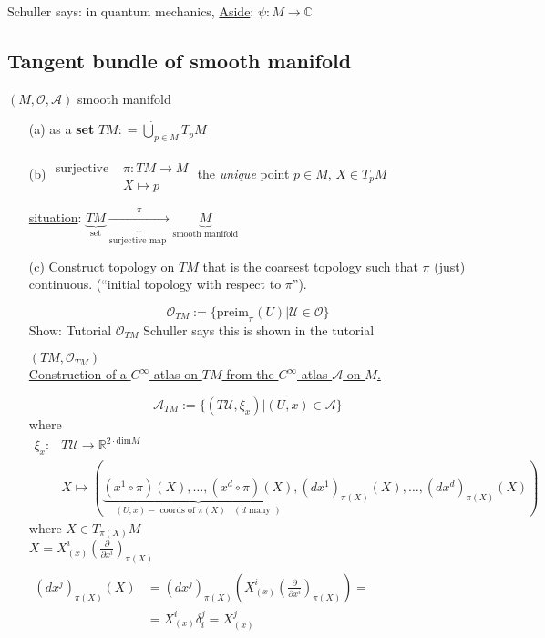 Schuller says: in quantum mechanics, 
\underline{Aside}: $\psi : M \to \mathbb{C}$


\subsection{Tangent bundle of smooth manifold}

$(M,\mathcal{O},\mathcal{A})$ smooth manifold

\begin{enumerate}
\item[(a)] as a \textbf{set}
  $TM : = \dot{\bigcup}_{p\in M} T_pM$
\item[(b)] $\begin{aligned} & \quad \\
  \text{surjective } & \pi: TM \to M \\
  & X\mapsto p \end{aligned}$ the \emph{unique} point $p\in M$, $X \in T_pM$  

\underline{situation}:  $\underbrace{TM}_{\text{set}} \underbrace{ \xrightarrow{ \pi } }_{\text{surjective map }} \underbrace{M}_{\text{smooth manifold}}$

\item[(c)] Construct topology on $TM$ that is the coarsest topology such that $\pi$ (just) continuous.  (``initial topology with respect to $\pi$'').

\[
\mathcal{O}_{TM} := \lbrace \text{preim}_{\pi}(U) | \mathcal{U}\in \mathcal{O} \rbrace
\]
Show: Tutorial $\mathcal{O}_{TM}$
Schuller says this is shown in the tutorial

$(TM,\mathcal{O}_{TM})$  \\

\underline{Construction of a $C^{\infty}$-atlas on $TM$ from the $C^{\infty}$-atlas $\mathcal{A}$ on $M$. }

\[
\mathcal{A}_{TM} := \lbrace (T\mathcal{U},\xi_x  ) | (U,x) \in \mathcal{A} \rbrace
\]
where
\[
\begin{aligned}
  \xi_x : & T \mathcal{U} \to \mathbb{R}^{2\cdot\text{dim}  M } \\
  & X \mapsto (\underbrace{ (x^1 \circ \pi)(X), \dots, (x^d\circ \pi)(X) }_{(U,x)-\text{ coords of $\pi(X)$ } \, (d \text{ many } ) } , (dx^1)_{\pi(X)}(X), \dots , (dx^d)_{\pi(X)}(X)  )
\end{aligned}
\]
where $X\in T_{\pi(X)}M$ \\
\phantom{where } $X = X_{(x)}^i \left( \frac{ \partial }{ \partial x^i} \right)_{\pi(X)}$  \\
\phantom{where } $\begin{aligned} \quad  & \\
  (dx^j)_{\pi(X)}(X) &= (dx^j)_{\pi(X)} \left( X^i_{(x)}\left( \frac{ \partial }{ \partial x^i} \right)_{\pi(X)} \right) = \\
  & = X^i_{(x)}\delta_i^j = X^j_{(x)}\end{aligned}$


\end{enumerate}
